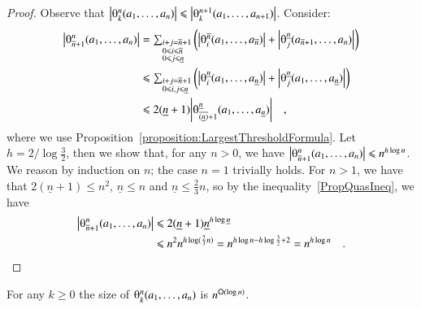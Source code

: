 \begin{proof}
Observe that $\size{\th kn\avec1n}\le\size{\th k{n+1}\avec1{n+1}}$. Consider:
\begin{equation}\label{PropQuasIneq}
\begin{split}
\size{\th{\overline n+1}n\avec1n}
&=\textstyle\sum_{\begin{subarray}{l}i+j=\overline n+1    \\
                                     0\le i\le \overline n\\
                                     0\le j\le {\underline n}
                  \end{subarray}}
  \left(\size{\th i{\overline n}\avec1{\overline n}}+
        \size{\th j{\underline n}\avec{\overline n+1}n}\right)             \\
&\le\textstyle\sum_{\begin{subarray}{l}i+j=\overline n+1\\
                                       0\le i,j\le {\underline n}
                    \end{subarray}}
  \left(\size{\th i{\underline n}\avec1{\underline n}}+
        \size{\th j{\underline n}\avec1{\underline n}}\right)                 \\
&\le2({\underline n}+1)
  \size{\th{\overline{(\underline n)}+1}{\underline n}\avec1{\underline n}}\quad,
\end{split}
\end{equation}
where we use Proposition~\vref{proposition:LargestThresholdFormula}. Let $h=2/\log\frac{3}{2}$, then we show that, for any $n>0$, we have $\size{\th{\overline n+1}n\avec1n}\le n^{h\log n}$. We reason by induction on $n$; the case $n=1$ trivially holds. For $n>1$, we have that $2(\underline n+1)\le n^2$, $\underline n\le n$ and $\underline n\le\frac{2}{3}n$, so by the inequality~\eqref{PropQuasIneq}, we have
\begin{equation*}
\begin{split}
\size{\th{\overline n+1}n\avec1n}
&\le2(\underline n+1)
     {\underline n}^{h\log\underline n}
       \\
&\le n^2n^{h\log(\frac{2}{3}n)}=n^{h\log n-h\log\frac{3}{2}+2}=n^{h\log n}
\quad.
\end{split}
\end{equation*}
\end{proof}

\begin{theorem}\label{theorem:SizeThreshold}
For any $k\ge0$ the size of\/ $\th kn\avec1n$ is $n^{{\mathsf O}(\log n)}$.
\end{theorem}

